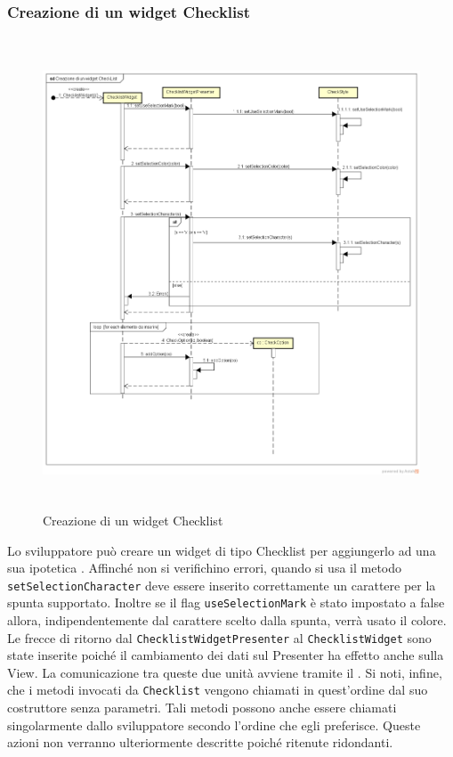 \newpage

\subsubsection{Creazione di un widget Checklist}

\label{Creazione di un widget Checklist}
\begin{figure}[ht]
	\centering
	\includegraphics[width=16cm, height=14cm]{Sezioni/Diagrammi/img/Creazione di un widget CheckList.png}
	\caption{Creazione di un widget Checklist}
\end{figure}

Lo sviluppatore può creare un widget di tipo Checklist per aggiungerlo ad una sua ipotetica . Affinché non si verifichino errori, quando si usa il metodo \texttt{setSelectionCharacter} deve essere inserito correttamente un carattere per la spunta supportato. Inoltre se il flag \texttt{useSelectionMark} è stato impostato a false allora, indipendentemente dal carattere scelto dalla spunta, verrà usato il colore.
Le frecce di ritorno dal \texttt{ChecklistWidgetPresenter}  al \texttt{ChecklistWidget} sono state inserite poiché il cambiamento dei dati sul Presenter ha effetto anche sulla View. La comunicazione tra queste due unità avviene tramite il  .
Si noti, infine, che i metodi invocati da \texttt{Checklist} vengono chiamati in quest'ordine dal suo costruttore senza parametri. Tali metodi possono anche essere chiamati singolarmente dallo sviluppatore secondo l'ordine che egli preferisce. Queste azioni non verranno ulteriormente descritte poiché ritenute ridondanti.


